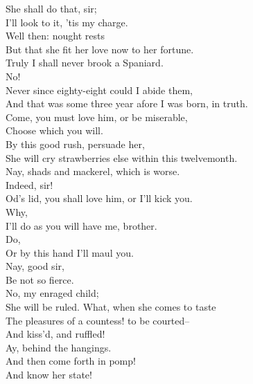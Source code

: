 \documentclass{memoir}
\begin{document}
\begin{drama*}
\kastrilspeaks {} She shall do that, sir;\\
 I'll look to it, 'tis my charge.\\
\subtlespeaks {} Well then: nought rests\\
 But that she fit her love now to her fortune.\\
\pliantspeaks  Truly I shall never brook a Spaniard.\\
\subtlespeaks  No!\\
\pliantspeaks {} Never since eighty-eight could I abide them,\\
 And that was some three year afore I was born, in truth.\\
\subtlespeaks  Come, you must love him, or be miserable,\\
 Choose which you will.\\
\facespeaks {} By this good rush, persuade her,\\
 She will cry strawberries else within this twelvemonth.\\
\subtlespeaks  Nay, shads and mackerel, which is worse.\\
\facespeaks {} Indeed, sir!\\
\kastrilspeaks  Od's lid, you shall love him, or I'll kick you.\\
\pliantspeaks  Why,\\
 I'll do as you will have me, brother.\\
\kastrilspeaks {} Do,\\
 Or by this hand I'll maul you.\\
\facespeaks {} Nay, good sir,\\
 Be not so fierce.\\
\subtlespeaks {} No, my enraged child;\\
 She will be ruled. What, when she comes to taste\\
 The pleasures of a countess! to be courted--\\
\facespeaks  And kiss'd, and ruffled!\\
\subtlespeaks {} Ay, behind the hangings.\\
\facespeaks  And then come forth in pomp!\\
\subtlespeaks {} And know her state!\\

\end{drama*}
\end{document}
